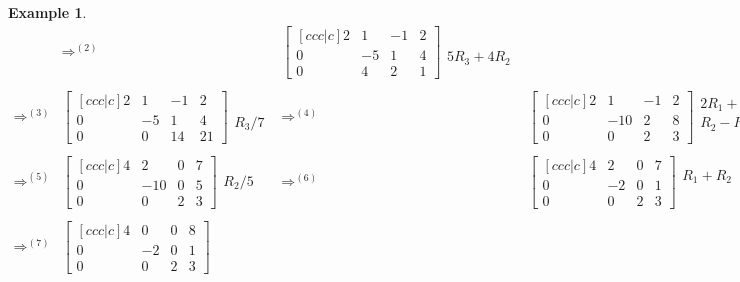 \documentclass[letterpaper,oneside]{book}%
\theoremstyle{plain}
\theoremstyle{box}
\newtheorem{example}[theorem]{Example}
\theoremstyle{problem}
\newcommand{\R}{\mathbb{R}}
\begin{document}
\begin{example}
$$\begin{array}{rlcl}
&\Rightarrow^{(2)}& 
\begin{bmatrix}[ccc|c] 2&1&-1&2\\0&-5&1&4\\0&4&2&1\end{bmatrix} 
\begin{array}{lr}\ \\ \ \\5R_3+4R_2 \end{array}
\\ \\ \Rightarrow^{(3)}&
 \begin{bmatrix}[ccc|c] 2&1&-1&2\\0&-5&1&4\\0&0&14&21\end{bmatrix} 
 \begin{array}{lr}\ \\ \ \\R_3/7 \end{array}
&\Rightarrow^{(4)}& 
\begin{bmatrix}[ccc|c] 2&1&-1&2\\0&-10&2&8\\0&0&2&3\end{bmatrix} 
\begin{array}{l} 2R_1+R_3\\R_2-R_3\\ \ \end{array}
\\ \\ \Rightarrow^{(5)}&
 \begin{bmatrix}[ccc|c] 4&2&0&7\\0&-10&0&5\\0&0&2&3\end{bmatrix}  
 \begin{array}{lr}\ \\R_2/5\\ \ \end{array} 
&\Rightarrow^{(6)}& 
\begin{bmatrix}[ccc|c] 4&2&0&7\\0&-2&0&1\\0&0&2&3\end{bmatrix}  
\begin{array}{lr} R_1+R_2\\ \ \\ \ \end{array}
\\ \\ \Rightarrow^{(7)}&
\begin{bmatrix}[ccc|c] 4&0&0&8\\0&-2&0&1\\0&0&2&3\end{bmatrix} 

\end{array}$$
\end{example}
\end{document}
